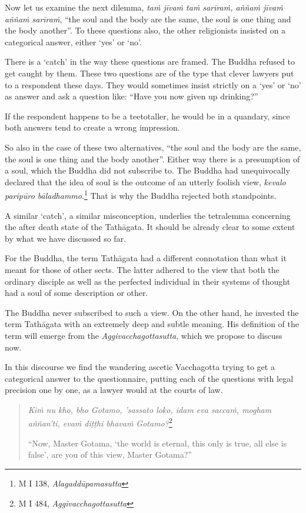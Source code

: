 Now let us examine the next dilemma, \emph{taṁ jīvaṁ taṁ sarīraṁ, aññaṁ jīvaṁ aññaṁ sarīraṁ}, ``the soul and the body are the same, the soul is one thing and the body another''. To these questions also, the other religionists insisted on a categorical answer, either `yes' or `no'.

There is a `catch' in the way these questions are framed. The Buddha refused to get caught by them. These two questions are of the type that clever lawyers put to a respondent these days. They would sometimes insist strictly on a `yes' or `no' as answer and ask a question like: ``Have you now given up drinking?''

If the respondent happens to be a teetotaller, he would be in a quandary, since both answers tend to create a wrong impression.

So also in the case of these two alternatives, ``the soul and the body are the same, the soul is one thing and the body another''. Either way there is a presumption of a soul, which the Buddha did not subscribe to. The Buddha had unequivocally declared that the idea of soul is the outcome of an utterly foolish view, \emph{kevalo paripūro bāladhammo}.\footnote{M I 138, \emph{Alagaddūpamasutta}} That is why the Buddha rejected both standpoints.

A similar `catch', a similar misconception, underlies the tetralemma concerning the after death state of the Tathāgata. It should be already clear to some extent by what we have discussed so far.

For the Buddha, the term Tathāgata had a different connotation than what it meant for those of other sects. The latter adhered to the view that both the ordinary disciple as well as the perfected individual in their systems of thought had a soul of some description or other.

The Buddha never subscribed to such a view. On the other hand, he invested the term Tathāgata with an extremely deep and subtle meaning. His definition of the term will emerge from the \emph{Aggivacchagottasutta}, which we propose to discuss now.

In this discourse we find the wandering ascetic Vacchagotta trying to get a categorical answer to the questionnaire, putting each of the questions with legal precision one by one, as a lawyer would at the courts of law.

\begin{quote}
\emph{Kiṁ nu kho, bho Gotamo, 'sassato loko, idam eva saccaṁ, mogham aññan'ti, evaṁ diṭṭhi bhavaṁ Gotamo?}\footnote{M I 484, \emph{Aggivacchagottasutta}}

``Now, Master Gotama, `the world is eternal, this only is true, all else is false', are you of this view, Master Gotama?''
\end{quote}


